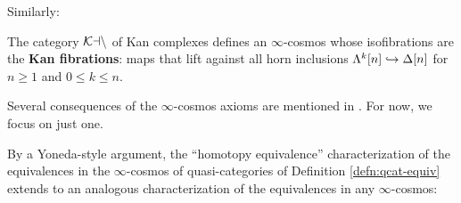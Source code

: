Similarly:

\begin{prop}\label{prop:kan-cosmos} The category ${\mathord{\mathcal{Kan}}}$ of Kan complexes defines an $\infty$-cosmos whose isofibrations are the \textbf{Kan fibrations}: maps that lift against all horn inclusions $\Lambda^k[n] \hookrightarrow \Delta[n]$ for $n \geq 1$ and $0 \leq k \leq n$.
\end{prop}

Several consequences of the $\infty$-cosmos axioms are mentioned in \cite[\S 1.2]{RiehlVerity:2022eo}. For now, we focus on just one.

By a Yoneda-style argument, the ``homotopy equivalence'' characterization of the equivalences in the $\infty$-cosmos of quasi-categories of Definition \ref{defn:qcat-equiv} extends to an analogous characterization of the equivalences in any $\infty$-cosmos:

